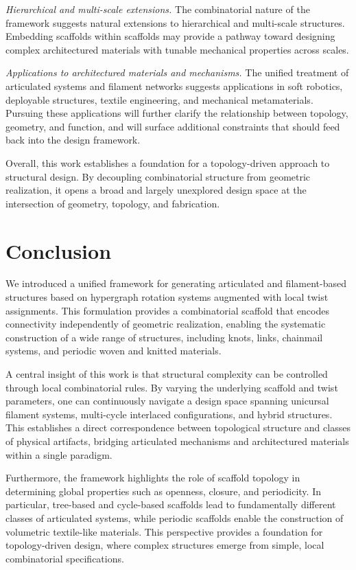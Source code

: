 \documentclass[acmtog,anonymous,review]{acmart}
\begin{document}
\textit{Hierarchical and multi-scale extensions.} The combinatorial nature of the framework suggests natural extensions to hierarchical and multi-scale structures. Embedding scaffolds within scaffolds may provide a pathway toward designing complex architectured materials with tunable mechanical properties across scales.

\textit{Applications to architectured materials and mechanisms.} The unified treatment of articulated systems and filament networks suggests applications in soft robotics, deployable structures, textile engineering, and mechanical metamaterials. Pursuing these applications will further clarify the relationship between topology, geometry, and function, and will surface additional constraints that should feed back into the design framework.

\medskip

Overall, this work establishes a foundation for a topology-driven approach to structural design. By decoupling combinatorial structure from geometric realization, it opens a broad and largely unexplored design space at the intersection of geometry, topology, and fabrication.


\section{Conclusion}


We introduced a unified framework for generating articulated and filament-based structures based on hypergraph rotation systems augmented with local twist assignments. This formulation provides a combinatorial scaffold that encodes connectivity independently of geometric realization, enabling the systematic construction of a wide range of structures, including knots, links, chainmail systems, and periodic woven and knitted materials.

A central insight of this work is that structural complexity can be controlled through local combinatorial rules. By varying the underlying scaffold and twist parameters, one can continuously navigate a design space spanning unicursal filament systems, multi-cycle interlaced configurations, and hybrid structures. This establishes a direct correspondence between topological structure and classes of physical artifacts, bridging articulated mechanisms and architectured materials within a single paradigm.

Furthermore, the framework highlights the role of scaffold topology in determining global properties such as openness, closure, and periodicity. In particular, tree-based and cycle-based scaffolds lead to fundamentally different classes of articulated systems, while periodic scaffolds enable the construction of volumetric textile-like materials. This perspective provides a foundation for topology-driven design, where complex structures emerge from simple, local combinatorial specifications.
\end{document}
